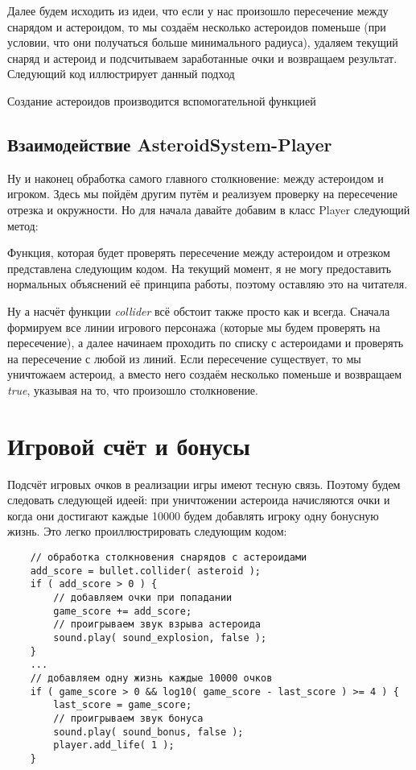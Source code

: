 Далее будем исходить из идеи, что если у нас произошло пересечение между снарядом и астероидом, то мы 
создаём несколько астероидов поменьше (при условии, что они получаться больше минимального радиуса), 
удаляем текущий снаряд и астероид и подсчитываем заработанные очки и возвращаем результат. Следующий код 
иллюстрирует данный подход


Создание астероидов производится вспомогательной функцией


\subsection{Взаимодействие AsteroidSystem-Player}
Ну и наконец обработка самого главного столкновение: между астероидом и игроком. Здесь мы пойдём другим 
путём и реализуем проверку на пересечение отрезка и окружности. Но для начала давайте добавим в класс 
Player следующий метод:


Функция, которая будет проверять пересечение между астероидом и отрезком представлена следующим кодом. На 
текущий момент, я не могу предоставить нормальных объяснений её принципа работы, поэтому оставляю это на 
читателя.


Ну а насчёт функции \emph{collider} всё обстоит также просто как и всегда. Сначала формируем все линии 
игрового персонажа (которые мы будем проверять на пересечение), а далее начинаем проходить по списку с 
астероидами и проверять на пересечение с любой из линий. Если пересечение существует, то мы уничтожаем 
астероид, а вместо него создаём несколько поменьше и возвращаем \emph{true}, указывая на то, что произошло 
столкновение.


\newpage

\section{Игровой счёт и бонусы}
Подсчёт игровых очков в реализации игры имеют тесную связь. Поэтому будем следовать следующей идеей: при 
уничтожении астероида начисляются очки и когда они достигают каждые 10000 будем добавлять игроку одну 
бонусную жизнь. Это легко проиллюстрировать следующим кодом:
\begin{lstlisting}
    // обработка столкновения снарядов с астероидами
    add_score = bullet.collider( asteroid );
    if ( add_score > 0 ) {
        // добавляем очки при попадании
        game_score += add_score;
        // проигрываем звук взрыва астероида
        sound.play( sound_explosion, false );
    }
    ...
    // добавляем одну жизнь каждые 10000 очков
    if ( game_score > 0 && log10( game_score - last_score ) >= 4 ) {
        last_score = game_score;
        // проигрываем звук бонуса
        sound.play( sound_bonus, false );
        player.add_life( 1 );
    }
\end{lstlisting}

